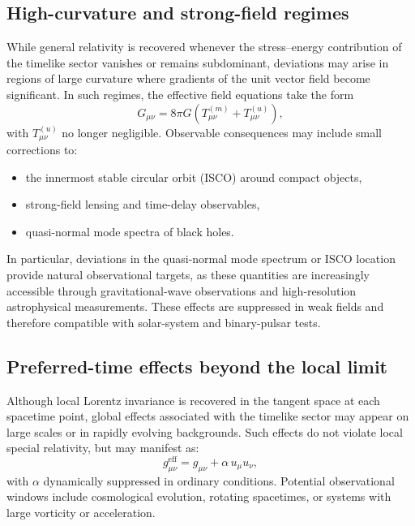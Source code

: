 \documentclass[11pt]{article}
\begin{document}
        \subsection{High-curvature and strong-field regimes}
            While general relativity is recovered whenever the stress--energy contribution
            of the timelike sector vanishes or remains subdominant, deviations may arise in
            regions of large curvature where gradients of the unit vector field become
            significant.
            In such regimes, the effective field equations take the form
            \begin{equation}
                G_{\mu\nu} = 8\pi G \left(T^{(m)}_{\mu\nu} + T^{(u)}_{\mu\nu}\right),
            \end{equation}
            with $T^{(u)}_{\mu\nu}$ no longer negligible.
            Observable consequences may include small corrections to:
            \begin{itemize}
                \item the innermost stable circular orbit (ISCO) around compact objects,
                \item strong-field lensing and time-delay observables,
                \item quasi-normal mode spectra of black holes.
            \end{itemize}
            In particular, deviations in the quasi-normal mode spectrum or ISCO location
            provide natural observational targets, as these quantities are increasingly
            accessible through gravitational-wave observations and high-resolution
            astrophysical measurements.
            These effects are suppressed in weak fields and therefore compatible with
            solar-system and binary-pulsar tests.

        \subsection{Preferred-time effects beyond the local limit}
            Although local Lorentz invariance is recovered in the tangent space at each
            spacetime point, global effects associated with the timelike sector may appear
            on large scales or in rapidly evolving backgrounds.
            Such effects do not violate local special relativity, but may manifest as:
            \begin{equation}
                g^{\mathrm{eff}}_{\mu\nu} = g_{\mu\nu} + \alpha\, u_\mu u_\nu ,
            \end{equation}
            with $\alpha$ dynamically suppressed in ordinary conditions.
            Potential observational windows include cosmological evolution, rotating
            spacetimes, or systems with large vorticity or acceleration.
\end{document}
